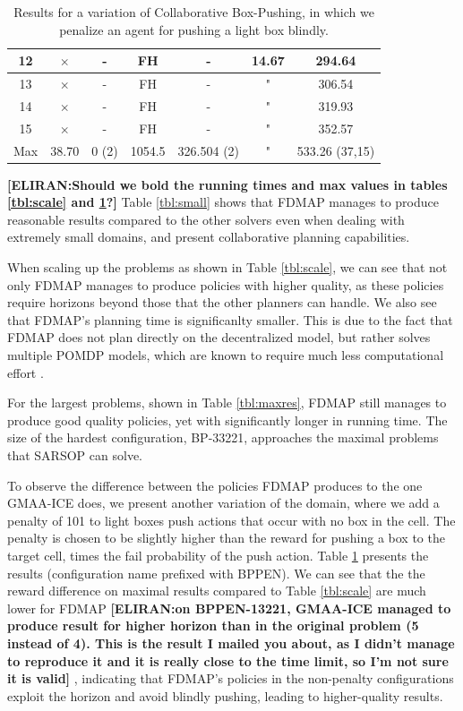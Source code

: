\documentclass[letterpaper]{article} %
\theoremstyle{definition}
\newcommand{\eliran}[1]{\textbf{[\color{red}ELIRAN:#1]}}
\newcommand{\cbp}[0]{Collaborative Box-Pushing}
\begin{document}
\begin{table}
{\begin{tabular}{||c|c|c|c|c|c|c||}
         \hline
         12 & $\times$ & - & FH & - & 14.67 & 294.64\\
        \hline
         13 & $\times$ & - & FH & - & " & 306.54 \\
        \hline
         14 & $\times$ & - & FH & - & " & 319.93 \\
        \hline
         15 & $\times$ & - & FH & - & " & 352.57 \\
        \hline
         Max& 38.70 & 0 (2) & 1054.5 & 326.504 (2) & " & 533.26 (37,15) \\
         \hline
    \end{tabular}
    }
    \caption{\label{tbl:bppen}Results for a variation of \cbp, in which we penalize an agent for pushing a light box blindly.}
\end{table}


\eliran{Should we bold the running times and max values in tables \ref{tbl:scale} and \ref{tbl:bppen}?}
Table \ref{tbl:small} shows that FDMAP manages to produce reasonable results compared to the other solvers even when dealing with extremely small domains, and present collaborative planning capabilities.

When scaling up the problems as shown in Table \ref{tbl:scale}, we can see that not only FDMAP manages to produce policies with higher quality, as these policies require horizons beyond those that the other planners can handle. We also see that FDMAP's planning time is significanlty smaller.
 This is due to the fact that FDMAP does not plan directly on the decentralized model, but rather solves multiple POMDP models, which are known to require much less computational effort \cite{DECPOMDPCOMP}.

For the largest problems, shown in Table \ref{tbl:maxres}, FDMAP still manages to produce good quality policies, yet with significantly longer in running time. The size of the hardest configuration, BP-33221, approaches the maximal problems that SARSOP \cite{SARSOP} can solve.

To observe the difference between the policies FDMAP produces to the one GMAA-ICE does, we present another variation of the domain, where we add a penalty of 101 to light boxes push actions that occur with no box in the cell. The penalty is chosen to be slightly higher than the reward for pushing a box to the target cell, times the fail probability of the push action. Table \ref{tbl:bppen} presents the results (configuration name prefixed with BPPEN). We can see that the the reward difference on maximal results compared to Table \ref{tbl:scale} are much lower for FDMAP
\eliran{on BPPEN-13221, GMAA-ICE managed to produce result for higher horizon than in the original problem (5 instead of 4). This is the result I mailed you about, as I didn't manage to reproduce it and it is really close to the time limit, so I'm not sure it is valid} , indicating that FDMAP's policies in the non-penalty configurations exploit the horizon and avoid blindly pushing, leading to higher-quality results.
\end{document}
